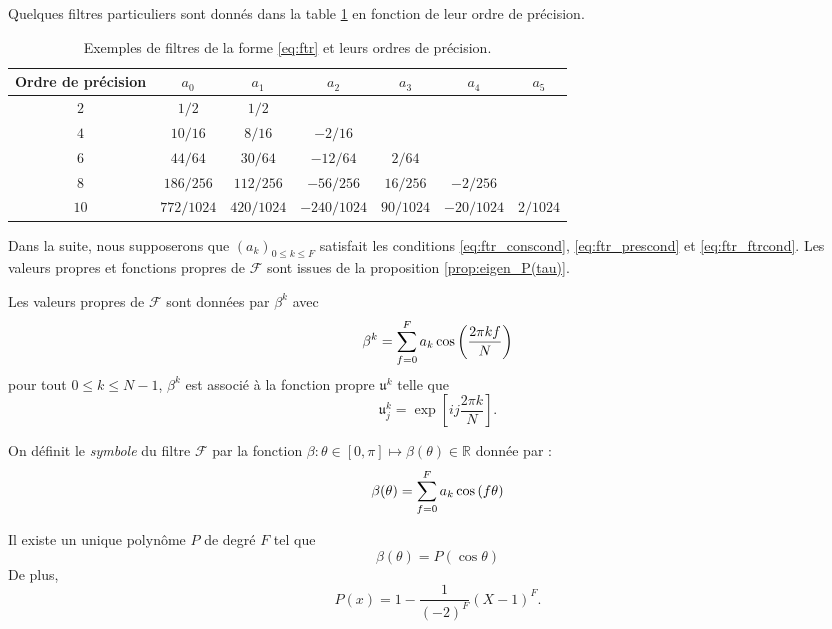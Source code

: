 Quelques filtres particuliers sont donnés dans la table \ref{tab:filter} en fonction de leur ordre de précision.
\begin{table}[htbp]
\begin{center}
\begin{tabular}{|c||cccccc|}
\hline
\textbf{Ordre de précision} & $a_0$ & $a_1$ & $a_2$ & $a_3$ & $a_4$ & $a_5$ \\
\hline \hline
$2$ & $1/2$ & $1/2$ & & & & \\
\hline
$4$ & $10/16$ & $8/16$ & $-2/16$ & & & \\
\hline
$6$ & $44/64$ & $30/64$ & $-12/64$ & $2/64$ & & \\
\hline
$8$ & $186/256$ & $112/256$ & $-56/256$ & $16/256$ & $-2/256$ & \\
\hline
$10$ & $772/1024$ & $420/1024$ & $-240/1024$ & $90/1024$ & $-20/1024$ & $2/1024$ \\
\hline
\end{tabular}
\end{center}
\caption{Exemples de filtres de la forme \eqref{eq:ftr} et leurs ordres de précision.}
\label{tab:filter}
\end{table}
Dans la suite, nous supposerons que $(a_k)_{0 \leq k \leq F}$ satisfait les conditions \eqref{eq:ftr_conscond}, \eqref{eq:ftr_prescond} et \eqref{eq:ftr_ftrcond}.
Les valeurs propres et fonctions propres de $\mathcal{F}$ sont issues de la proposition \ref{prop:eigen_P(tau)}.

\begin{theoreme}
Les valeurs propres de $\mathcal{F}$ sont données par $\beta^k$ avec 
\begin{equation}
\beta^k = \displaystyle\sum\limits_{f=0}^F a_k \cos \left( \dfrac{2 \pi k f}{N} \right)
\end{equation}
pour tout $0 \leq k \leq N-1$, $\beta^k$ est associé à la fonction propre $\mathfrak{u}^k$ telle que 
\begin{equation}
\mathfrak{u}^k_j = \exp \left[ i j \dfrac{2 \pi k}{N} \right].
\end{equation}
\end{theoreme}

On définit le \textit{symbole} du filtre $\mathcal{F}$ par la fonction $\beta : \theta \in [0, \pi] \mapsto \beta(\theta) \in \mathbb{R}$ donnée par :
\begin{equation}
\beta( \theta ) = \displaystyle\sum\limits_{f=0}^F a_k \cos \left( f \theta \right)
\end{equation}

\begin{proposition}
Il existe un unique polynôme $P$ de degré $F$ tel que 
\begin{equation}
\beta(\theta) = P(\cos \theta )
\end{equation}
De plus,
\begin{equation}
P(x) = 1 -\dfrac{1}{(-2)^F} (X - 1)^F.
\end{equation}
\end{proposition}

